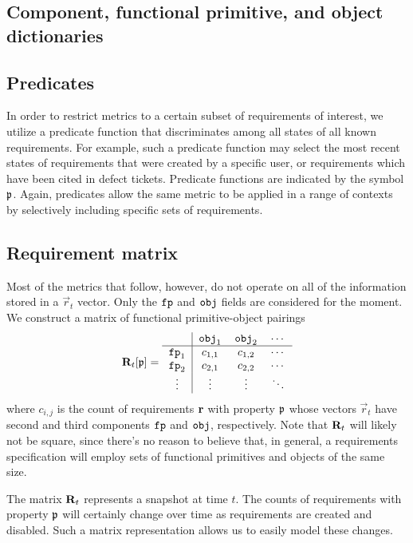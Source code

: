 \documentclass{article}
\begin{document}
\subsection{Component, functional primitive, and object dictionaries}


\subsection{Predicates}
\label{sec:predicates}

In order to restrict metrics to a certain subset of requirements of
interest, we utilize a predicate function that discriminates among all
states of all known requirements. For example, such a predicate
function may select the most recent states of requirements that were
created by a specific user, or requirements which have been cited in
defect tickets. Predicate functions are indicated by the symbol
$\mathfrak{p}$. Again, predicates allow the same metric to be applied in a
range of contexts by selectively including specific sets of
requirements.


\subsection{Requirement matrix}

Most of the metrics that follow, however, do not operate on all of the
information stored in a $\vec{r}_t$ vector. Only the $\mathtt{fp}$ and $\mathtt{obj}$
fields are considered for the moment. We construct a matrix of
functional primitive-object pairings
\begin{equation}
\mat{R}_t[\pred{p}] = \begin{tabular}{c|ccc}
  & $\obj_1$ & $\obj_2$ & $\cdots$\\
  \hline
  $\fp_1$ & $c_{1,1}$ & $c_{1,2}$ & $\cdots$ \\
  $\fp_2$ & $c_{2,1}$ & $c_{2,2}$ & $\cdots$ \\
  $\vdots$ & $\vdots$ & $\vdots$ & $\ddots$
\end{tabular}
\end{equation}
where $c_{i,j}$ is the count of requirements $\mathbf{r}$ with property
$\mathfrak{p}$ whose vectors $\vec{r}_t$ have second and third components
$\mathtt{fp}$ and $\mathtt{obj}$, respectively. Note that $\mathbf{R}_t$ will likely not
be square, since there's no reason to believe that, in general, a
requirements specification will employ sets of functional
primitives and objects of the same size.

The matrix $\mathbf{R}_t$ represents a snapshot at time $t$. The counts
of requirements with property $\mathfrak{p}$ will certainly change over
time as requirements are created and disabled. Such a matrix
representation allows us to easily model these changes.
\end{document}
